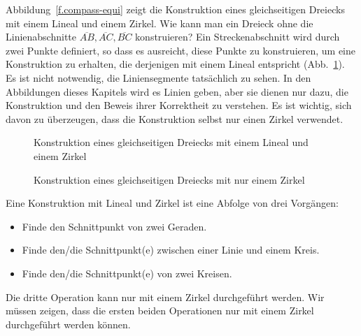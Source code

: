 Abbildung~\ref{f.compass-equi} zeigt die Konstruktion eines gleichseitigen Dreiecks mit einem Lineal und einem Zirkel. Wie kann man ein Dreieck ohne die Linienabschnitte $\overline{AB}, \overline{AC}, \overline{BC}$ konstruieren? Ein Streckenabschnitt wird durch zwei Punkte definiert, so dass es ausreicht, diese Punkte zu konstruieren, um eine Konstruktion zu erhalten, die derjenigen mit einem Lineal entspricht (Abb.~\ref{f.compass-equi-only}). Es ist nicht notwendig, die Liniensegmente tatsächlich zu sehen.
In den Abbildungen dieses Kapitels wird es Linien geben, aber sie dienen nur dazu, die Konstruktion und den Beweis ihrer Korrektheit zu verstehen. Es ist wichtig, sich davon zu überzeugen, dass die Konstruktion selbst nur einen Zirkel verwendet.
\begin{figure}[ht]
\begin{minipage}{.45\textwidth}
\caption{Konstruktion eines gleichseitigen Dreiecks mit einem Lineal und einem Zirkel}\label{f.compass-equi}
\end{minipage}
\hfill
\begin{minipage}{.45\textwidth}
\centering
{}
\end{minipage}
\caption{Konstruktion eines gleichseitigen Dreiecks mit nur einem Zirkel}\label{f.compass-equi-only}
\end{figure}

Eine Konstruktion mit Lineal und Zirkel ist eine Abfolge von drei Vorgängen:
\begin{itemize}
\item Finde den Schnittpunkt von zwei Geraden.
\item Finde den/die Schnittpunkt(e) zwischen einer Linie und einem Kreis.
\item Finde den/die Schnittpunkt(e) von zwei Kreisen.
\end{itemize}
Die dritte Operation kann nur mit einem Zirkel durchgeführt werden. Wir müssen zeigen, dass die ersten beiden Operationen nur mit einem Zirkel durchgeführt werden können.

